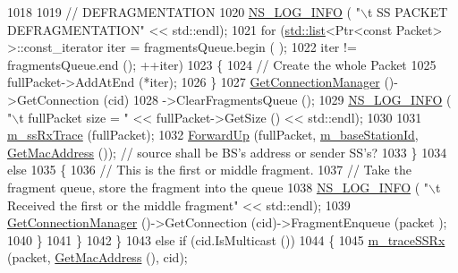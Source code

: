\begin{DoxyCode}
1018 
1019                   \textcolor{comment}{// DEFRAGMENTATION}
1020                   \hyperlink{group__logging_gafbd73ee2cf9f26b319f49086d8e860fb}{NS\_LOG\_INFO} ( \textcolor{stringliteral}{"\(\backslash\)t SS PACKET DEFRAGMENTATION"} << std::endl);
1021                   \textcolor{keywordflow}{for} (\hyperlink{openflow-interface_8h_afd9bcfa176617760671b67580f536fa7}{std::list}<Ptr<const Packet> >::const\_iterator iter = fragmentsQueue.begin (
      );
1022                        iter != fragmentsQueue.end (); ++iter)
1023                     \{
1024                       \textcolor{comment}{// Create the whole Packet}
1025                       fullPacket->AddAtEnd (*iter);
1026                     \}
1027                   \hyperlink{classns3_1_1WimaxNetDevice_a25450b18f62f91e4c2ab08485bd171a2}{GetConnectionManager} ()->GetConnection (cid)
1028                   ->ClearFragmentsQueue ();
1029                   \hyperlink{group__logging_gafbd73ee2cf9f26b319f49086d8e860fb}{NS\_LOG\_INFO} ( \textcolor{stringliteral}{"\(\backslash\)t fullPacket size = "} << fullPacket->GetSize () << std::endl);
1030 
1031                   \hyperlink{classns3_1_1SubscriberStationNetDevice_a88c8f706dea73606f68daa73703f65b5}{m\_ssRxTrace} (fullPacket);
1032                   \hyperlink{classns3_1_1WimaxNetDevice_ae6d708e65981c36d43f075527b11eb8d}{ForwardUp} (fullPacket, \hyperlink{classns3_1_1SubscriberStationNetDevice_a9745729222112443a4b527f681537c48}{m\_baseStationId}, 
      \hyperlink{classns3_1_1WimaxNetDevice_aa02eb7f6de9c03f0b8f2e33e3c5b5559}{GetMacAddress} ()); \textcolor{comment}{// source shall be BS's address or sender SS's?}
1033                 \}
1034               \textcolor{keywordflow}{else}
1035                 \{
1036                   \textcolor{comment}{// This is the first or middle fragment.}
1037                   \textcolor{comment}{// Take the fragment queue, store the fragment into the queue}
1038                   \hyperlink{group__logging_gafbd73ee2cf9f26b319f49086d8e860fb}{NS\_LOG\_INFO} ( \textcolor{stringliteral}{"\(\backslash\)t Received the first or the middle fragment"} << std::endl);
1039                   \hyperlink{classns3_1_1WimaxNetDevice_a25450b18f62f91e4c2ab08485bd171a2}{GetConnectionManager} ()->GetConnection (cid)->FragmentEnqueue (packet
      );
1040                 \}
1041             \}
1042         \}
1043       \textcolor{keywordflow}{else} \textcolor{keywordflow}{if} (cid.IsMulticast ())
1044         \{
1045           \hyperlink{classns3_1_1SubscriberStationNetDevice_aa1771f784eeb694c5ad2035f97ee52e5}{m\_traceSSRx} (packet, \hyperlink{classns3_1_1WimaxNetDevice_aa02eb7f6de9c03f0b8f2e33e3c5b5559}{GetMacAddress} (), cid);

\end{DoxyCode}
